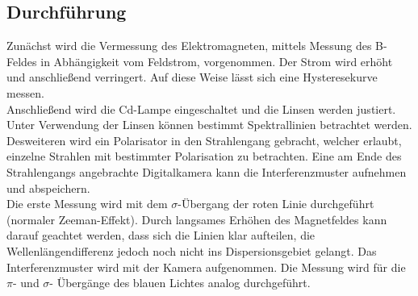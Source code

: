 \subsection{Durchführung}
Zunächst wird die Vermessung des Elektromagneten, mittels Messung des B-Feldes in Abhängigkeit vom Feldstrom, vorgenommen.
Der Strom wird erhöht und anschließend verringert. Auf diese Weise lässt sich eine Hysteresekurve messen.\\
Anschließend wird die Cd-Lampe eingeschaltet und die Linsen werden justiert.
Unter Verwendung der Linsen können bestimmt Spektrallinien betrachtet werden.
Desweiteren wird ein Polarisator in den Strahlengang gebracht, welcher erlaubt, einzelne Strahlen mit bestimmter Polarisation zu betrachten.
Eine am Ende des Strahlengangs angebrachte Digitalkamera kann die Interferenzmuster aufnehmen und abspeichern.\\
%
Die erste Messung wird mit dem $\sigma$-Übergang der roten Linie durchgeführt (normaler Zeeman-Effekt).
Durch langsames Erhöhen des Magnetfeldes kann darauf geachtet werden, dass sich die Linien klar aufteilen, die Wellenlängendifferenz jedoch noch nicht ins Dispersionsgebiet gelangt.
Das Interferenzmuster wird mit der Kamera aufgenommen.
Die Messung wird für die $\pi$- und $\sigma$- Übergänge des blauen Lichtes analog durchgeführt.
\FloatBarrier
